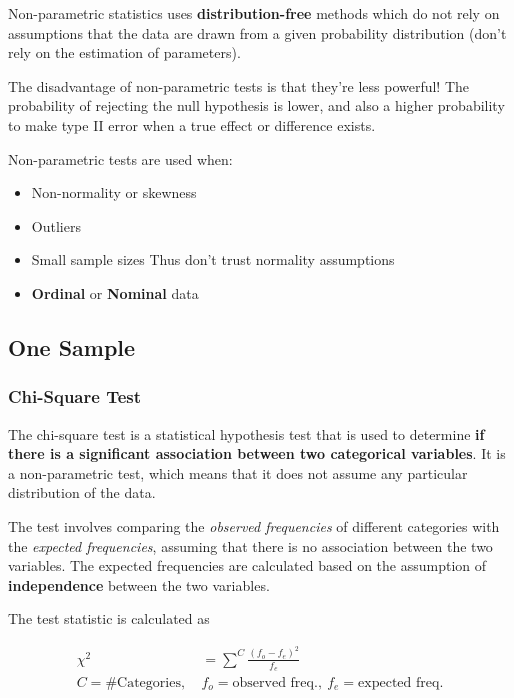 \documentclass[
]{ctexart}
\providecommand{\tightlist}{%
  \setlength{\itemsep}{0pt}\setlength{\parskip}{0pt}}
\begin{document}
Non-parametric statistics uses \textbf{distribution-free} methods which
do not rely on assumptions that the data are drawn from a given
probability distribution (don't rely on the estimation of parameters).

The disadvantage of non-parametric tests is that they're less powerful!
The probability of rejecting the null hypothesis is lower, and also a
higher probability to make type II error when a true effect or
difference exists.

Non-parametric tests are used when:

\begin{itemize}
\tightlist
\item
  Non-normality or skewness
\item
  Outliers
\item
  Small sample sizes Thus don't trust normality assumptions
\item
  \textbf{Ordinal} or \textbf{Nominal} data
\end{itemize}

\hypertarget{one-sample}{%
\subsection{One Sample}\label{one-sample}}

\hypertarget{chi-square-test}{%
\subsubsection{Chi-Square Test}\label{chi-square-test}}

The chi-square test is a statistical hypothesis test that is used to
determine \textbf{if there is a significant association between two
categorical variables}. It is a non-parametric test, which means that it
does not assume any particular distribution of the data.

The test involves comparing the \emph{observed frequencies} of different
categories with the \emph{expected frequencies}, assuming that there is
no association between the two variables. The expected frequencies are
calculated based on the assumption of \textbf{independence} between the
two variables.

The test statistic is calculated as

\[
\begin{aligned}
\chi^2&=\sum^C\frac{(f_o-f_e)^2}{f_e}\\
C=\#\text{Categories},\ &f_o=\text{observed freq}.,\ f_e=\text{expected freq.}
\end{aligned}
\]
\end{document}
